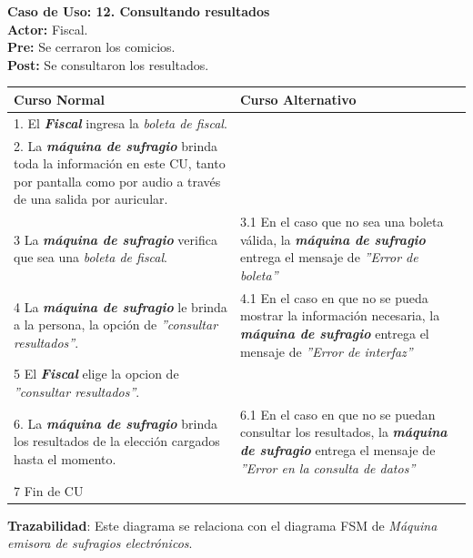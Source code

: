 \documentclass[spanish, 10pt,a4paper]{article}
\numberwithin{equation}{section} %
\begin{document}
\noindent\textbf{Caso de Uso: 12. Consultando resultados}\\
\textbf{Actor: } Fiscal.\\
\textbf{Pre: } Se cerraron los comicios.\\
\textbf{Post: } Se consultaron los resultados.\\
\begin{table}[H]
  \centering
\bgroup
\def\arraystretch{1.3}
  \begin{tabular}{p{9cm} | p{7cm}}
    \hline
    Curso Normal & Curso Alternativo \\
    \hline
    \hline    
    1. El \textbf{\textit{Fiscal}} ingresa la \textit{boleta de fiscal}. 
    & \\
    
    \hline
    2. La \textbf{\textit{máquina de sufragio}} brinda toda la información en este CU, tanto por pantalla como por audio a través de una salida por auricular.
    &
    \\
    
    \hline
    3 La \textbf{\textit{máquina de sufragio}} verifica que sea una \textit{boleta de fiscal}.
    & 
    3.1 En el caso que no sea una boleta válida, la \textbf{\textit{máquina de sufragio}} entrega el mensaje de \textit{''Error de boleta''}
    \\
    
    \hline
    4 La \textbf{\textit{máquina de sufragio}} le brinda a la persona, la opción de \textit{''consultar resultados''}.
    & 
    4.1 En el caso en que no se pueda mostrar la información necesaria, la \textbf{\textit{máquina de sufragio}} entrega el mensaje de \textit{''Error de interfaz''}
    \\
    
    \hline
    5 El \textbf{\textit{Fiscal}} elige la opcion de \textit{''consultar resultados''}.
    & \\
    
    \hline
    6. La \textbf{\textit{máquina de sufragio}} brinda los resultados de la elección cargados hasta el momento.
    &
    6.1 En el caso en que no se puedan consultar los resultados, la \textbf{\textit{máquina de sufragio}} entrega el mensaje de \textit{''Error en la consulta de datos''}
    \\
    
    \hline
    7 Fin de CU
    & \\
    \hline
  \end{tabular}
\egroup
\end{table}
\vspace{-10px}
\noindent\textbf{Trazabilidad}: Este diagrama se relaciona con el diagrama FSM de \textit{Máquina emisora de sufragios electrónicos}.\\
\end{document}
